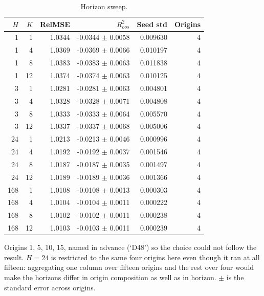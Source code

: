 \begin{table}[!t]
\centering
\caption{Horizon sweep.}
\label{tab:horizons}
\begin{tabular}{rrrrrr}
\toprule
$H$ & $K$ & RelMSE & $R^2_{oos}$ & Seed std & Origins \\
\midrule
1 & 1 & 1.0344 & -0.0344 $\pm$ 0.0058 & 0.009630 & 4 \\
1 & 4 & 1.0369 & -0.0369 $\pm$ 0.0066 & 0.010197 & 4 \\
1 & 8 & 1.0383 & -0.0383 $\pm$ 0.0063 & 0.011838 & 4 \\
1 & 12 & 1.0374 & -0.0374 $\pm$ 0.0063 & 0.010125 & 4 \\
3 & 1 & 1.0281 & -0.0281 $\pm$ 0.0063 & 0.004801 & 4 \\
3 & 4 & 1.0328 & -0.0328 $\pm$ 0.0071 & 0.004808 & 4 \\
3 & 8 & 1.0333 & -0.0333 $\pm$ 0.0064 & 0.005570 & 4 \\
3 & 12 & 1.0337 & -0.0337 $\pm$ 0.0068 & 0.005006 & 4 \\
24 & 1 & 1.0213 & -0.0213 $\pm$ 0.0046 & 0.000996 & 4 \\
24 & 4 & 1.0192 & -0.0192 $\pm$ 0.0037 & 0.001546 & 4 \\
24 & 8 & 1.0187 & -0.0187 $\pm$ 0.0035 & 0.001497 & 4 \\
24 & 12 & 1.0189 & -0.0189 $\pm$ 0.0036 & 0.001366 & 4 \\
168 & 1 & 1.0108 & -0.0108 $\pm$ 0.0013 & 0.000303 & 4 \\
168 & 4 & 1.0104 & -0.0104 $\pm$ 0.0011 & 0.000222 & 4 \\
168 & 8 & 1.0102 & -0.0102 $\pm$ 0.0011 & 0.000238 & 4 \\
168 & 12 & 1.0103 & -0.0103 $\pm$ 0.0011 & 0.000239 & 4 \\
\bottomrule
\end{tabular}
\vspace{2pt}\par\footnotesize Origins 1, 5, 10, 15, named in advance (`D48') so the choice could not follow the result. $H=24$ is restricted to the same four origins here even though it ran at all fifteen: aggregating one column over fifteen origins and the rest over four would make the horizons differ in origin composition as well as in horizon. $\pm$ is the standard error across origins.
\end{table}

